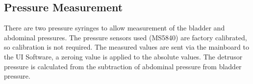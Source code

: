 \subsection{Pressure Measurement}

There are two pressure syringes to allow measurement of the bladder and abdominal pressures. The pressure sensors used (MS5840) are factory calibrated, so calibration is not required. The measured values are sent via the mainboard to the UI Software, a zeroing value is applied to the absolute values. The detrusor pressure is calculated from the subtraction of abdominal pressure from bladder pressure.